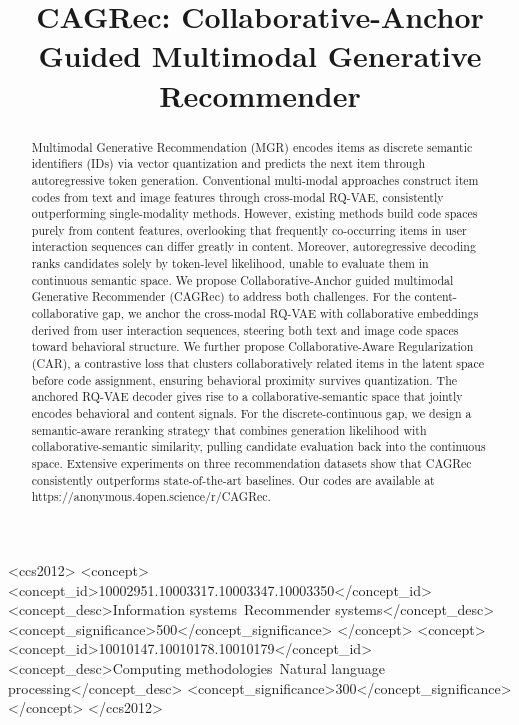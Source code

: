 \documentclass[sigconf, anonymous, review]{acmart}
\begin{document}
\title{CAGRec: Collaborative-Anchor Guided Multimodal Generative Recommender}


\begin{abstract}
Multimodal Generative Recommendation (MGR) encodes items as discrete semantic identifiers (IDs) via vector quantization and predicts the next item through autoregressive token generation. 
% 
Conventional multi-modal approaches construct item codes from text and image features through cross-modal RQ-VAE, consistently outperforming single-modality methods. 
% 
However, existing methods build code spaces purely from content features, overlooking that frequently co-occurring items in user interaction sequences can differ greatly in content.
% 
Moreover, autoregressive decoding ranks candidates solely by token-level likelihood, unable to evaluate them in continuous semantic space. 
% 
We propose Collaborative-Anchor guided multimodal Generative Recommender (CAGRec) to address both challenges. 
% 
For the content-collaborative gap, we anchor the cross-modal RQ-VAE with collaborative embeddings derived from user interaction sequences, steering both text and image code spaces toward behavioral structure.
%
We further propose Collaborative-Aware Regularization (CAR), a contrastive loss that clusters collaboratively related items in the latent space before code assignment, ensuring behavioral proximity survives quantization.
%
The anchored RQ-VAE decoder gives rise to a collaborative-semantic space that jointly encodes behavioral and content signals.
%
For the discrete-continuous gap, we design a semantic-aware reranking strategy that combines generation likelihood with collaborative-semantic similarity, pulling candidate evaluation back into the continuous space.
% 
Extensive experiments on three recommendation datasets show that CAGRec consistently outperforms state-of-the-art baselines.
% 
Our codes are available at https://anonymous.4open.science/r/CAGRec.
\end{abstract}

\begin{CCSXML}
<ccs2012>
 <concept>
  <concept_id>10002951.10003317.10003347.10003350</concept_id>
  <concept_desc>Information systems~Recommender systems</concept_desc>
  <concept_significance>500</concept_significance>
 </concept>
 <concept>
  <concept_id>10010147.10010178.10010179</concept_id>
  <concept_desc>Computing methodologies~Natural language processing</concept_desc>
  <concept_significance>300</concept_significance>
 </concept>
</ccs2012>
\end{CCSXML}
\end{document}
